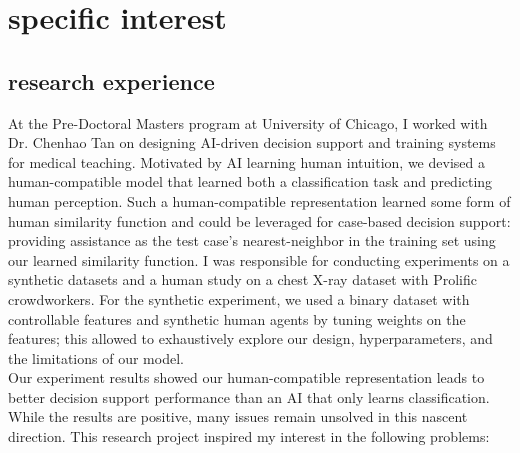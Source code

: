 
\section{specific interest}


\subsection{research experience}
At the Pre-Doctoral Masters program at University of Chicago, I worked with Dr. Chenhao Tan on designing AI-driven decision support and training systems for medical teaching.
Motivated by AI learning human intuition, we devised a human-compatible model that learned both a classification task and predicting human perception. Such a human-compatible representation learned some form of human similarity function and could be leveraged for case-based decision support: providing assistance as the test case's nearest-neighbor in the training set using our learned similarity function. 
I was responsible for conducting experiments on a synthetic datasets and a human study on a chest X-ray dataset with Prolific crowdworkers. 
For the synthetic experiment, we used a binary dataset with controllable features and synthetic human agents by tuning weights on the features; this allowed to exhaustively explore our design, hyperparameters, and the limitations of our model. \\

Our experiment results showed our human-compatible representation leads to better decision support performance than an AI that only learns classification. While the results are positive, many issues remain unsolved in this nascent direction. This research project inspired my interest in the following problems: 


